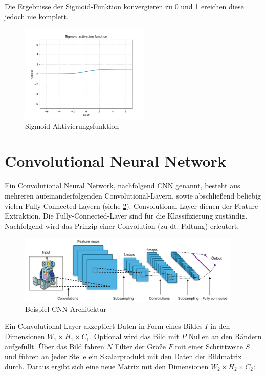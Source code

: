 Die Ergebnisse der Sigmoid-Funktion konvergieren zu 0 und 1 ereichen diese jedoch nie komplett.

\begin{figure}[H]
	\centering
	\includegraphics[width=0.55\textwidth]{resources/content/Sigmoid.png}
	\caption{Sigmoid-Aktivierungsfunktion \cite{sigmoid_activation_function_img}}
	\label{img:sigmoid_activation_function}
\end{figure}

\section{Convolutional Neural Network}
\label{sec:conv_networks}

Ein Convolutional Neural Network, nachfolgend CNN genannt, besteht aus mehreren aufeinanderfolgenden Convolutional-Layern, sowie
abschließend beliebig vielen Fully-Connected-Layern (siehe \ref{img:cnn_example_network}). Convolutional-Layer dienen der Feature-Extraktion. Die Fully-Connected-Layer sind für die Klassifizierung zuständig. Nachfolgend wird das Prinzip einer Convolution (zu dt. Faltung) erleutert.

\begin{figure}[H]
	\centering
	\includegraphics[width=0.95\textwidth]{resources/content/cnn/typical_cnn.png}
	\caption{Beispiel CNN Architektur \cite{typical_cnn_img}}
	\label{img:cnn_example_network}
\end{figure}

Ein Convolutional-Layer akzeptiert Daten in Form eines Bildes $ I $ in den Dimensionen $ W_1 \times H_1 \times C_1 $. Optional wird das Bild mit $ P $ Nullen an den Rändern aufgefüllt. Über das Bild fahren $ N $ Filter der Größe $ F $ mit einer Schrittweite $ S $ und führen an jeder Stelle ein Skalarprodukt mit den Daten der Bildmatrix durch. Daraus ergibt sich eine neue Matrix mit den Dimensionen $ W_2 \times H_2 \times C_2 $:

